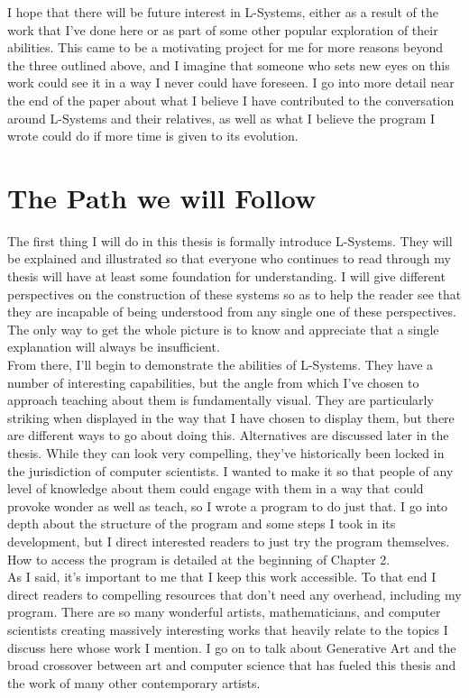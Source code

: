 \documentclass[12pt,twoside]{reedthesis}
\begin{document}
	I hope that there will be future interest in L-Systems, either as a result of the work that I’ve done here or as part of some other popular exploration of their abilities. This came to be a motivating project for me for more reasons beyond the three outlined above, and I imagine that someone who sets new eyes on this work could see it in a way I never could have foreseen. I go into more detail near the end of the paper about what I believe I have contributed to the conversation around L-Systems and their relatives, as well as what I believe the program I wrote could do if more time is given to its evolution.\\
	
\section{The Path we will Follow}

	The first thing I will do in this thesis is formally introduce L-Systems. They will be explained and illustrated so that everyone who continues to read through my thesis will have at least some foundation for understanding. I will give different perspectives on the construction of these systems so as to help the reader see that they are incapable of being understood from any single one of these perspectives. The only way to get the whole picture is to know and appreciate that a single explanation will always be insufficient.\\
	
	From there, I'll begin to demonstrate the abilities of L-Systems. They have a number of interesting capabilities, but the angle from which I've chosen to approach teaching about them is fundamentally visual. They are particularly striking when displayed in the way that I have chosen to display them, but there are different ways to go about doing this. Alternatives are discussed later in the thesis. While they can look very compelling, they've historically been locked in the jurisdiction of computer scientists. I wanted to make it so that people of any level of knowledge about them could engage with them in a way that could provoke wonder as well as teach, so I wrote a program to do just that. I go into depth about the structure of the program and some steps I took in its development, but I direct interested readers to just try the program themselves. How to access the program is detailed at the beginning of Chapter 2.\\
	
	As I said, it's important to me that I keep this work accessible. To that end I direct readers to compelling resources that don't need any overhead, including my program. There are so many wonderful artists, mathematicians, and computer scientists creating massively interesting works that heavily relate to the topics I discuss here whose work I mention. I go on to talk about Generative Art and the broad crossover between art and computer science that has fueled this thesis and the work of many other contemporary artists.\\
	
\end{document}
